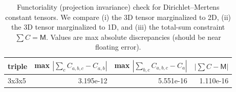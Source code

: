 \begin{table}[H]
\centering
\scriptsize
\setlength{\tabcolsep}{6pt}
\caption{Functoriality (projection invariance) check for Dirichlet--Mertens constant tensors. We compare (i) the 3D tensor marginalized to 2D, (ii) the 3D tensor marginalized to 1D, and (iii) the total-sum constraint $\sum C=\mathsf{M}$. Values are max absolute discrepancies (should be near floating error).}
\label{tab:real_input_40_dirichlet_mertens_functoriality}
\begin{tabular}{l r r r}
\toprule
triple & max $|\sum_c C_{a,b,c}-C_{a,b}|$ & max $|\sum_{b,c} C_{a,b,c}-C_a|$ & $|\sum C-\mathsf{M}|$\\
\midrule
3x3x5 & 3.195e-12 & 5.551e-16 & 1.110e-16\\
\bottomrule
\end{tabular}
\end{table}
